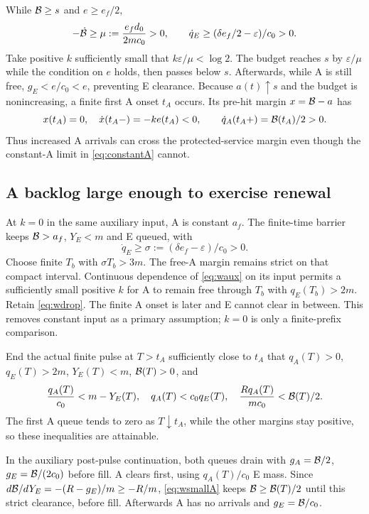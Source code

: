 While $\mathcal B\geq s$ and $e\geq e_f/2$,
\begin{equation}
 -\dot{\mathcal B}\geq\mu:=\frac{e_fd_0}{2mc_0}>0,\qquad
 \dot q_E\geq(\delta e_f/2-\varepsilon)/c_0>0.
 \label{eq:wdrop}
\end{equation}
Take positive $k$ sufficiently small that
$k\varepsilon/\mu<\log2$. The budget reaches $s$ by
$\varepsilon/\mu$ while the condition on $e$ holds, then passes below
$s$. Afterwards, while A is still free, $g_E<e/c_0<e$, preventing E
clearance. Because $a(t)\uparrow s$ and the budget is nonincreasing, a
finite first A onset $t_A$ occurs. Its pre-hit margin $x=\mathcal B-a$ has
\begin{equation}
 x(t_A)=0,\quad\dot x(t_A-)=-ke(t_A)<0,\qquad
 \dot q_A(t_A+)=\mathcal B(t_A)/2>0. \label{eq:wAbirth}
\end{equation}
Thus increased A arrivals can cross the protected-service margin even
though the constant-A limit in \eqref{eq:constantA} cannot.

\subsection{A backlog large enough to exercise renewal}
At $k=0$ in the same auxiliary input, A is constant $a_f$. The finite-time
barrier keeps $\mathcal B>a_f$, $Y_E<m$ and E queued, with
\begin{equation}
 \dot q_E\geq\sigma:=(\delta e_f-\varepsilon)/c_0>0.
 \label{eq:wbacklog}
\end{equation}
Choose finite $T_b$ with $\sigma T_b>3m$. The free-A margin remains
strict on that compact interval. Continuous dependence of
\eqref{eq:waux} on its input permits a sufficiently small positive $k$
for A to remain free through $T_b$ with $q_E(T_b)>2m$. Retain
\eqref{eq:wdrop}. The finite A onset is later and E cannot clear in between.
This removes constant input as a primary assumption; $k=0$ is only a
finite-prefix comparison.

End the actual finite pulse at $T>t_A$ sufficiently close to $t_A$ that
$q_A(T)>0$, $q_E(T)>2m$, $Y_E(T)<m$, $\mathcal B(T)>0$, and
\begin{equation}
 \frac{q_A(T)}{c_0}<m-Y_E(T),\quad
 q_A(T)<c_0q_E(T),\quad
 \frac{Rq_A(T)}{mc_0}<\mathcal B(T)/2. \label{eq:wsmallA}
\end{equation}
The first A queue tends to zero as $T\downarrow t_A$, while the other
margins stay positive, so these inequalities are attainable.

In the auxiliary post-pulse continuation, both queues drain with
$g_A=\mathcal B/2$, $g_E=\mathcal B/(2c_0)$ before fill. A clears first,
using $q_A(T)/c_0$ E mass. Since
$d\mathcal B/dY_E=-(R-g_E)/m\geq-R/m$, \eqref{eq:wsmallA} keeps
$\mathcal B\geq\mathcal B(T)/2$ until this strict clearance, before fill.
Afterwards A has no arrivals and $g_E=\mathcal B/c_0$.

